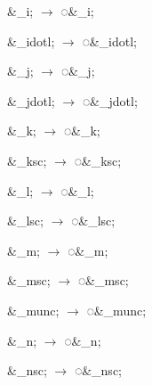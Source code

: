 \documentclass[letterpaper,12pt]{article}
\newcommand\textstyleEntityRef[1]{\textrm{#1}}
\begin{document}
\begin{multicols}{3}
\textcolor[rgb]{0.20392157,0.39607844,0.6431373}{\&\_{\textcompwordmark}i; $\rightarrow $
}\textstyleEntityRef{\textcolor[rgb]{0.20392157,0.39607844,0.6431373}{◌\&\_i;}}

\textcolor[rgb]{0.20392157,0.39607844,0.6431373}{\&\_{\textcompwordmark}idotl; $\rightarrow $
}\textstyleEntityRef{\textcolor[rgb]{0.20392157,0.39607844,0.6431373}{◌\&\_idotl;}}

\textcolor[rgb]{0.20392157,0.39607844,0.6431373}{\&\_{\textcompwordmark}j; $\rightarrow $
}\textstyleEntityRef{\textcolor[rgb]{0.20392157,0.39607844,0.6431373}{◌\&\_j;}}

\textcolor[rgb]{0.20392157,0.39607844,0.6431373}{\&\_{\textcompwordmark}jdotl; $\rightarrow $
}\textstyleEntityRef{\textcolor[rgb]{0.20392157,0.39607844,0.6431373}{◌\&\_jdotl;}}

\textcolor[rgb]{0.20392157,0.39607844,0.6431373}{\&\_{\textcompwordmark}k; $\rightarrow $
}\textstyleEntityRef{\textcolor[rgb]{0.20392157,0.39607844,0.6431373}{◌\&\_k;}}

\textcolor[rgb]{0.20392157,0.39607844,0.6431373}{\&\_{\textcompwordmark}ksc; $\rightarrow $
}\textstyleEntityRef{\textcolor[rgb]{0.20392157,0.39607844,0.6431373}{◌\&\_ksc;}}

\textcolor[rgb]{0.20392157,0.39607844,0.6431373}{\&\_{\textcompwordmark}l; $\rightarrow $
}\textstyleEntityRef{\textcolor[rgb]{0.20392157,0.39607844,0.6431373}{◌\&\_l;}}

\textcolor[rgb]{0.20392157,0.39607844,0.6431373}{\&\_{\textcompwordmark}lsc; $\rightarrow $
}\textstyleEntityRef{\textcolor[rgb]{0.20392157,0.39607844,0.6431373}{◌\&\_lsc;}}

\textcolor[rgb]{0.20392157,0.39607844,0.6431373}{\&\_{\textcompwordmark}m; $\rightarrow $
}\textstyleEntityRef{\textcolor[rgb]{0.20392157,0.39607844,0.6431373}{◌\&\_m;}}

\textcolor[rgb]{0.20392157,0.39607844,0.6431373}{\&\_{\textcompwordmark}msc; $\rightarrow $
}\textstyleEntityRef{\textcolor[rgb]{0.20392157,0.39607844,0.6431373}{◌\&\_msc;}}

\textcolor[rgb]{0.20392157,0.39607844,0.6431373}{\narrow\&\_{\textcompwordmark}munc; $\rightarrow $
}\textstyleEntityRef{\textcolor[rgb]{0.20392157,0.39607844,0.6431373}{◌\&\_munc;}}

\textcolor[rgb]{0.20392157,0.39607844,0.6431373}{\&\_{\textcompwordmark}n; $\rightarrow $
}\textstyleEntityRef{\textcolor[rgb]{0.20392157,0.39607844,0.6431373}{◌\&\_n;}}

\textcolor[rgb]{0.20392157,0.39607844,0.6431373}{\&\_{\textcompwordmark}nsc; $\rightarrow $
}\textstyleEntityRef{\textcolor[rgb]{0.20392157,0.39607844,0.6431373}{◌\&\_nsc;}}


\end{multicols}
\end{document}
